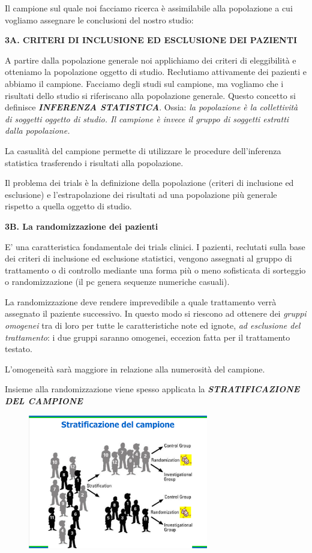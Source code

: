 Il campione sul quale noi facciamo ricerca è assimilabile alla
popolazione a cui vogliamo assegnare le conclusioni del nostro studio:

\textbf{3A. CRITERI DI INCLUSIONE ED ESCLUSIONE DEI PAZIENTI}

A partire dalla popolazione generale noi applichiamo dei criteri di
eleggibilità e otteniamo la popolazione oggetto di studio. Reclutiamo
attivamente dei pazienti e abbiamo il campione. Facciamo degli studi sul
campione, ma vogliamo che i risultati dello studio si riferiscano alla
popolazione generale. Questo concetto si definisce
\textbf{\emph{INFERENZA STATISTICA}}. Ossia: \emph{la popolazione è la
collettività di soggetti oggetto di studio. Il campione è invece il
gruppo di soggetti estratti dalla popolazione.}

La casualità del campione permette di utilizzare le procedure
dell'inferenza statistica trasferendo i risultati alla popolazione.

Il problema dei trials è la definizione della popolazione (criteri di
inclusione ed esclusione) e l'estrapolazione dei risultati ad una
popolazione più generale rispetto a quella oggetto di studio.

\textbf{3B. La randomizzazione dei pazienti}

E' una caratteristica fondamentale dei trials clinici. I pazienti,
reclutati sulla base dei criteri di inclusione ed esclusione statistici,
vengono assegnati al gruppo di trattamento o di controllo mediante una
forma più o meno sofisticata di sorteggio o randomizzazione (il pc
genera sequenze numeriche casuali).

La randomizzazione deve rendere imprevedibile a quale trattamento verrà
assegnato il paziente successivo. In questo modo si riescono ad ottenere
dei \emph{gruppi omogenei} tra di loro per tutte le caratteristiche note
ed ignote, \emph{ad esclusione del trattamento}: i due gruppi saranno
omogenei, eccezion fatta per il trattamento testato.

L'omogeneità sarà maggiore in relazione alla numerosità del campione.

Insieme alla randomizzazione viene spesso applicata la
\textbf{\emph{STRATIFICAZIONE DEL CAMPIONE }}

\begin{figure}[!ht]
\centering
\includegraphics[width=0.7\textwidth]{05/image14.png}
\end{figure}

